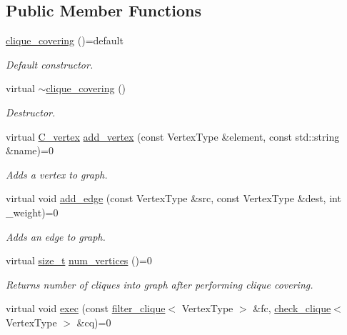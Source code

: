 \subsection*{Public Member Functions}
\begin{DoxyCompactItemize}
\item 
\hyperlink{classclique__covering_a00aee81e82d36e7ed0b91f1f3778518e}{clique\+\_\+covering} ()=default
\begin{DoxyCompactList}\small\item\em Default constructor. \end{DoxyCompactList}\item 
virtual \hyperlink{classclique__covering_aac1e12323281aea1d4c8939c1445267f}{$\sim$clique\+\_\+covering} ()
\begin{DoxyCompactList}\small\item\em Destructor. \end{DoxyCompactList}\item 
virtual \hyperlink{clique__covering__graph_8hpp_a9cb45047ea8c5ed95a8cfa90494345aa}{C\+\_\+vertex} \hyperlink{classclique__covering_a69a986de5537f3104ee2cea23a88c49d}{add\+\_\+vertex} (const Vertex\+Type \&element, const std\+::string \&name)=0
\begin{DoxyCompactList}\small\item\em Adds a vertex to graph. \end{DoxyCompactList}\item 
virtual void \hyperlink{classclique__covering_ae8fc02dd0bdb4500dc24bf1fa88f00d4}{add\+\_\+edge} (const Vertex\+Type \&src, const Vertex\+Type \&dest, int \+\_\+weight)=0
\begin{DoxyCompactList}\small\item\em Adds an edge to graph. \end{DoxyCompactList}\item 
virtual \hyperlink{tutorial__fpt__2017_2intro_2sixth_2test_8c_a7c94ea6f8948649f8d181ae55911eeaf}{size\+\_\+t} \hyperlink{classclique__covering_ad387948a7851179bb056e68c72097008}{num\+\_\+vertices} ()=0
\begin{DoxyCompactList}\small\item\em Returns number of cliques into graph after performing clique covering. \end{DoxyCompactList}\item 
virtual void \hyperlink{classclique__covering_a54c35fc0f400f32f3d412783685150ef}{exec} (const \hyperlink{structfilter__clique}{filter\+\_\+clique}$<$ Vertex\+Type $>$ \&fc, \hyperlink{structcheck__clique}{check\+\_\+clique}$<$ Vertex\+Type $>$ \&cq)=0

\end{DoxyCompactItemize}
